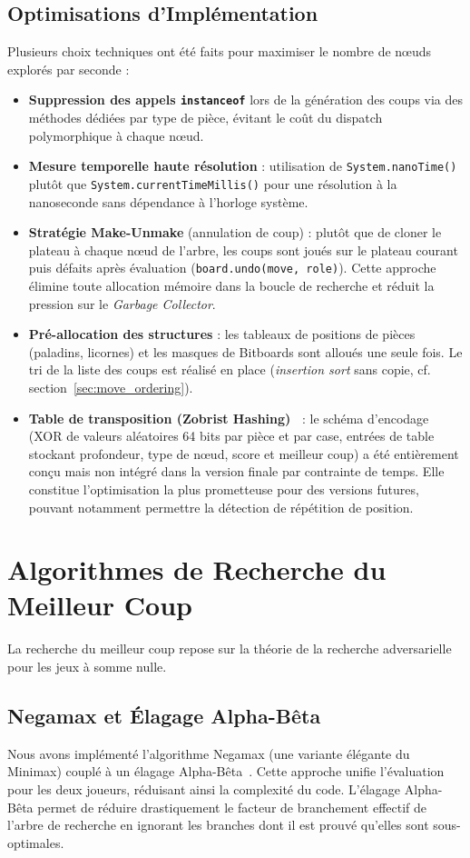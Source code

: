 \documentclass[12pt,a4paper]{article}
\begin{document}
\subsection{Optimisations d'Implémentation}
Plusieurs choix techniques ont été faits pour maximiser le nombre de nœuds explorés par seconde :
\begin{itemize}
    \item \textbf{Suppression des appels \texttt{instanceof}} lors de la génération des coups via des méthodes dédiées par type de pièce, évitant le coût du dispatch polymorphique à chaque nœud.
    \item \textbf{Mesure temporelle haute résolution} : utilisation de \texttt{System.nanoTime()} plutôt que \texttt{System.currentTimeMillis()} pour une résolution à la nanoseconde sans dépendance à l'horloge système.
    \item \textbf{Stratégie Make-Unmake} (annulation de coup) : plutôt que de cloner le plateau à chaque nœud de l'arbre, les coups sont joués sur le plateau courant puis défaits après évaluation (\texttt{board.undo(move, role)}). Cette approche élimine toute allocation mémoire dans la boucle de recherche et réduit la pression sur le \textit{Garbage Collector}.
    \item \textbf{Pré-allocation des structures} : les tableaux de positions de pièces (paladins, licornes) et les masques de Bitboards sont alloués une seule fois. Le tri de la liste des coups est réalisé en place (\textit{insertion sort} sans copie, cf. section~\ref{sec:move_ordering}).
    \item \textbf{Table de transposition (Zobrist Hashing)~\cite{cp_zobrist}} : le schéma d'encodage (XOR de valeurs aléatoires 64 bits par pièce et par case, entrées de table stockant profondeur, type de nœud, score et meilleur coup) a été entièrement conçu mais non intégré dans la version finale par contrainte de temps. Elle constitue l'optimisation la plus prometteuse pour des versions futures, pouvant notamment permettre la détection de répétition de position.
\end{itemize}

\section{Algorithmes de Recherche du Meilleur Coup}
La recherche du meilleur coup repose sur la théorie de la recherche adversarielle pour les jeux à somme nulle.

\subsection{Negamax et Élagage Alpha-Bêta}
Nous avons implémenté l'algorithme Negamax (une variante élégante du Minimax) couplé à un élagage Alpha-Bêta~\cite{cp_alphabeta}. Cette approche unifie l'évaluation pour les deux joueurs, réduisant ainsi la complexité du code. L'élagage Alpha-Bêta permet de réduire drastiquement le facteur de branchement effectif de l'arbre de recherche en ignorant les branches dont il est prouvé qu'elles sont sous-optimales.
\end{document}
